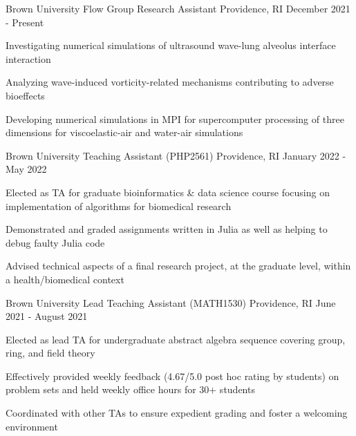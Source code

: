 
\begin{cventries}

    \cventry
        {Brown University}
        {Flow Group Research Assistant}
        {Providence, RI}
        {December 2021 - Present} 
        {
            \begin{cvitems}
              \item {Investigating numerical simulations of ultrasound wave-lung alveolus interface interaction}
              \item {Analyzing wave-induced vorticity-related mechanisms contributing to adverse bioeffects}
              \item {Developing numerical simulations in MPI for supercomputer processing of three dimensions for viscoelastic-air and water-air simulations}
            \end{cvitems}
        }

    \cventry 
        {Brown University}
        {Teaching Assistant (PHP2561)}
        {Providence, RI}
        {January 2022 - May 2022}
        {
            \begin{cvitems}
                \item {Elected as TA for graduate bioinformatics \& data science course focusing on implementation of algorithms for biomedical research}
                \item {Demonstrated and graded assignments written in Julia as well as helping to debug faulty Julia code} 
                \item {Advised technical aspects of a final research project, at the graduate level, within a health/biomedical context}
            \end{cvitems}
        }

  \cventry
    {Brown University} %
    {Lead Teaching Assistant (MATH1530)} %
    {Providence, RI} %
    {June 2021 - August 2021} %
    {
      \begin{cvitems} %
        \item {Elected as lead TA for undergraduate abstract algebra sequence covering group, ring, and field theory}
        \item {Effectively provided weekly feedback (4.67/5.0 post hoc rating by students) on problem sets and held weekly office hours for 30+ students}
        \item {Coordinated with other TAs to ensure expedient grading and foster a welcoming environment}
      \end{cvitems}
    }


\end{cventries}
